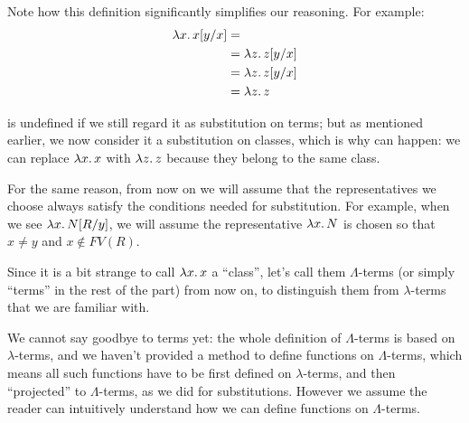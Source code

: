 \documentclass[../../../include/open-logic-section]{subfiles}
\begin{document}
Note how this definition significantly simplifies our reasoning. For
example:
\begin{align}
  \Subst{\lambd[x][x]}{y}{x} & =\ollabel{eq:1}\\
  &= \Subst{\lambd[z][z]}{y}{x} \ollabel{eq:2}\\
  &= \lambd[z][\Subst{z}{y}{x}] \\
  &= \lambd[z][z]
\end{align}

 is undefined if we still regard it as substitution on
terms; but as mentioned earlier, we now consider it a substitution on
classes, which is why  can happen: we can replace
$\lambd[x][x]$ with $\lambd[z][z]$ because they belong to the same
class.

For the same reason, from now on we will assume that the
representatives we choose always satisfy the conditions needed for
substitution. For example, when we see $\Subst{\lambd[x][N]}{R}{y}$,
we will assume the representative $\lambd[x][N]$ is chosen so that
$x \neq y$ and $x \notin FV(R)$.

Since it is a bit strange to call $\lambd[x][x]$ a ``class'', let's
call them $\Lambda$-terms (or simply ``terms'' in the rest of the
part) from now on, to distinguish them from $\lambda$-terms that we
are familiar with.

\begin{editorial}
  We cannot say goodbye to terms yet: the whole definition of
  $\Lambda$-terms is based on $\lambda$-terms, and we haven't provided
  a method to define functions on $\Lambda$-terms, which means all
  such functions have to be first defined  on $\lambda$-terms, and
  then ``projected'' to $\Lambda$-terms, as we did for substitutions.
  However we assume the reader can intuitively understand how we can
  define functions on $\Lambda$-terms.
\end{editorial}
\end{document}
